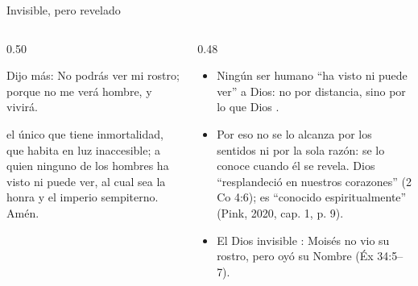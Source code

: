 \begin{frame}{Invisible, pero revelado}
\begin{columns}[t,onlytextwidth]
\begin{column}{0.50\textwidth}
\begin{cita}Dijo más: No podrás ver mi rostro; porque no me verá hombre, y vivirá.\end{cita}
\begin{cita}el único que tiene inmortalidad, que habita en luz inaccesible; a quien ninguno de los hombres ha visto ni puede ver, al cual sea la honra y el imperio sempiterno. Amén.\end{cita}
\end{column}
\begin{column}{0.48\textwidth}\small
\begin{itemize}
\item Ningún ser humano ``ha visto ni puede ver'' a Dios: no por distancia, sino por lo que Dios .
\item Por eso no se lo alcanza por los sentidos ni por la sola razón: se lo conoce cuando él se revela. Dios ``resplandeció en nuestros corazones'' (2 Co 4:6); es ``conocido espiritualmente'' (Pink, 2020, cap. 1, p. 9).
\item El Dios invisible : Moisés no vio su rostro, pero oyó su Nombre (Éx 34:5--7).
\end{itemize}
\end{column}
\end{columns}
\end{frame}

